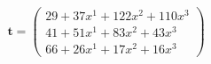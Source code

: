 \documentclass[preview]{standalone}
\begin{document}
\begin{align*}
\mathbf{t} = \begin{pmatrix}29 + 37x^{1} + 122x^{2} + 110x^{3} \\ 41 + 51x^{1} + 83x^{2} + 43x^{3} \\ 66 + 26x^{1} + 17x^{2} + 16x^{3}\end{pmatrix}
\end{align*}
\end{document}
